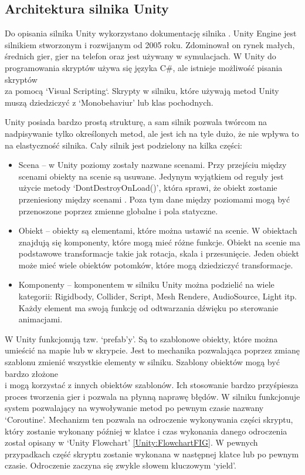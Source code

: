 \documentclass[12pt,twoside]{article}
\begin{document}
\clearpage

\subsection{Architektura silnika Unity}
Do opisania silnika Unity wykorzystano dokumentację silnika
\cite{Unity:Documentatnion}. Unity Engine jest silnikiem stworzonym i rozwijanym
od 2005 roku. Zdominował on rynek małych, średnich gier, gier na
telefon oraz jest używany w symulacjach. W Unity do programowania skryptów używa
się języka C\#, ale istnieje możliwość pisania skryptów\\za pomocą `Visual
Scripting`. Skrypty w silniku, które używają metod Unity muszą dziedziczyć z
‘Monobehaviur’ lub klas pochodnych. 

Unity posiada bardzo prostą strukturę, a sam silnik pozwala twórcom na
nadpisywanie tylko określonych metod, ale jest ich na tyle dużo, że nie wpływa
to na elastyczność silnika. Cały silnik jest podzielony na kilka
części: 
\begin{itemize}
\item Scena – w Unity poziomy zostały nazwane scenami. Przy przejściu między
scenami obiekty na scenie są usuwane. Jedynym wyjątkiem od reguły jest użycie
metody ‘DontDestroyOnLoad()’, która sprawi, że obiekt zostanie przeniesiony
między scenami \cite{Unity:DonSaveOnLoad}. Poza tym dane między poziomami mogą być przenoszone poprzez
zmienne globalne i pola statyczne\cite{Unity:Scena}.
\item Obiekt – obiekty są elementami, które można ustawić na scenie. W obiektach
znajdują się komponenty, które mogą mieć różne funkcje. Obiekt na scenie ma
podstawowe transformacje takie jak rotacja, skala i przesunięcie. Jeden obiekt
może mieć wiele obiektów potomków, które mogą dziedziczyć transformacje\cite{Unity:Obiekt}. 
\item Komponenty – komponentem w silniku Unity można podzielić na wiele
kategorii: Rigidbody, Collider, Script, Mesh Rendere, AudioSource, Light itp.
Każdy element ma swoją funkcję od odtwarzania dźwięku po sterowanie animacjami. 
\end{itemize}
W Unity funkcjonują tzw. ‘prefab'y’. Są to szablonowe obiekty, które można
umieścić na mapie lub w skrypcie. Jest to mechanika pozwalająca poprzez zmianę
szablonu zmienić wszystkie elementy w silniku. Szablony obiektów mogą być bardzo
złożone\\i mogą korzystać z innych obiektów szablonów. Ich stosowanie bardzo
przyśpiesza proces tworzenia gier i pozwala na płynną naprawę błędów. W silniku
funkcjonuje system pozwalający na wywoływanie metod po pewnym czasie nazwany
‘Coroutine’. Mechanizm ten pozwala na odroczenie wykonywania części skryptu,
który zostanie wykonany później w klatce i czas wykonania danego odroczenia
został opisany w ‘Unity Flowchart’ \ref{Unity:FlowchartFIG}. W pewnych
przypadkach część skryptu zostanie wykonana w następnej klatce lub po pewnym
czasie. Odroczenie zaczyna się zwykle słowem kluczowym ‘yield’.  
\end{document}
